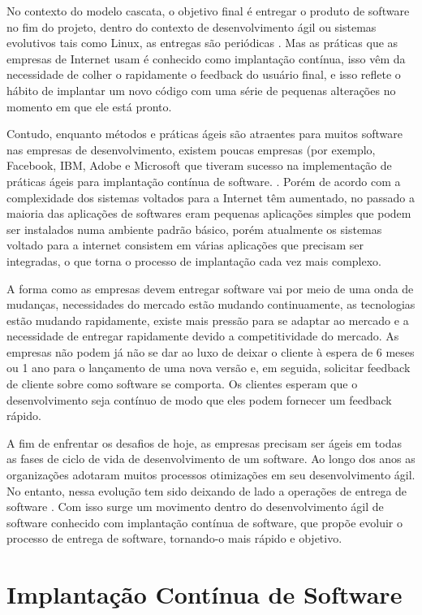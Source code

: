 \documentclass[12pt]{article}
\begin{document}
No contexto do modelo cascata, o objetivo final é entregar o produto de software no fim do projeto, dentro do contexto de desenvolvimento ágil ou sistemas evolutivos tais como Linux, as entregas são periódicas \cite{6612879}. Mas as práticas que as empresas de Internet usam é conhecido como implantação contínua, isso vêm da necessidade de colher o rapidamente  o feedback do usuário final, e isso reflete o hábito de implantar um novo código com uma série de pequenas alterações no momento em que ele está pronto.

Contudo, enquanto métodos e práticas ágeis são atraentes para muitos software nas empresas de desenvolvimento, existem poucas empresas (por exemplo, Facebook, IBM, Adobe e Microsoft que tiveram sucesso na implementação de práticas ágeis para implantação contínua de software. \cite{Claps201521}. Porém de acordo com \cite{6265084} a complexidade dos sistemas voltados para a Internet têm aumentado, no passado a maioria das aplicações de softwares eram pequenas aplicações simples que podem ser instalados numa ambiente padrão básico, porém atualmente os sistemas voltado para a internet consistem em várias aplicações que precisam ser integradas, o que torna o processo de implantação cada vez mais complexo. \cite{6265084}

A forma como as empresas devem entregar software vai por meio de uma onda de mudanças, necessidades do mercado estão mudando continuamente, as tecnologias estão mudando rapidamente, existe mais pressão para se adaptar ao mercado e a necessidade de entregar rapidamente devido a competitividade do mercado. As empresas não podem já não se dar ao luxo de deixar o cliente à espera de 6 meses ou 1 ano para o lançamento de uma nova versão e, em seguida, solicitar feedback de cliente sobre como software se comporta. Os clientes esperam que o desenvolvimento seja contínuo de modo que eles podem fornecer um feedback rápido. 

A fim de enfrentar os desafios de hoje, as empresas precisam ser  ágeis em todas as fases de ciclo de vida de desenvolvimento de um software. Ao longo dos anos as organizações adotaram muitos processos otimizações em seu desenvolvimento ágil. No entanto, nessa evolução tem sido deixando de lado a operações de entrega de software \cite{7173368}. Com isso surge um movimento dentro do desenvolvimento ágil de software conhecido com implantação contínua de software, que propõe evoluir o processo de entrega de software, tornando-o mais rápido e objetivo.

\section{Implantação Contínua de Software} \label{sec2}
\end{document}
